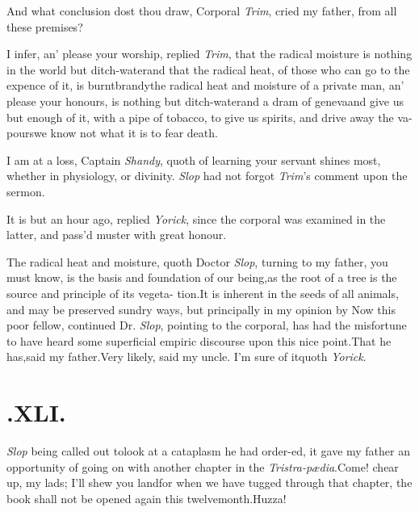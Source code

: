 \documentclass{article}
\begin{document}
And what conclusion dost thou draw, Corporal \textit{Trim}, cried
my father, from all these premises?

I infer, an’ please your worship, re\-plied \textit{Trim},
that the radical moisture is nothing in the world but
ditch-water\tsh\break and that the radical heat, of those who can go to
the expence of it, is burnt\break brandy\tsk the radical heat and
moisture of a private man, an’ please your honours, is nothing
but ditch-water\tsk and a dram of geneva\tsh and give us
but enough of it, with a pipe of tobacco, to give us spirits, and
drive away the va- pours\tsk we know not what it is to fear
death.

I am at a loss, Captain \textit{Shandy}, quoth 
of learning your servant shines most,\break
whether in physiology, or divinity.\tsk\break
\textit{Slop} had not forgot \textit{Trim}’s comment\break
upon the sermon.\tsk

It is but an hour ago, replied \textit{Yorick}, since the corporal
was examined in the latter, and pass’d muster with great\break
honour.\tsh

The radical heat and moisture, quoth Doctor \textit{Slop}, turning
to my father, you must know, is the basis and foundation of our
being,\tsk as the root of a tree is the source and principle of
its vegeta-
tion.\tsk It is inherent in the seeds of all animals, and may be
preserved sundry ways, but principally in my opinion by
\tsh Now this poor fellow, continued Dr.\@
\textit{Slop}, pointing to the corporal, has had the misfortune
to have heard some superficial empiric discourse upon this nice
point.\tsh That he has,\tsk said my father.\tsh Very likely,
said my uncle.\break
\tsk I’m sure of it\tsk quoth \textit{Yorick}.\tsh

\smallskip

\section{.\enspace  XLI.}

 \textit{Slop} being called out
to\break look at a cataplasm he had order-\break ed, it gave my father an
opportunity of going on with another chapter in the\break
\textit{Tristra-pædia}.\tsh Come! chear up, my 
lads; I’ll shew you land\tsh for when\break
we have tugged through that chapter,\break
the book shall not be opened again this\break
twelvemonth.\tsk Huzza!\tsk
\end{document}
